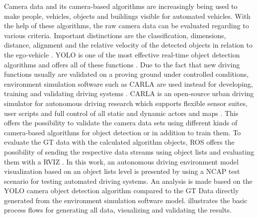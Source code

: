 Camera data and its camera-based algorithms are increasingly being used to make people, vehicles, objects and buildings visible for automated vehicles. With the help of these algorithms, the raw camera data can be evaluated regarding to various criteria. Important distinctions are the classification, dimensions, distance, alignment and the relative velocity of the detected objects in relation to the ego-vehicle \cite{Aeberhard}. \ac{YOLO} is one of the most effective real-time object detection algorithms and offers all of these functions \cite{knuthwebsite}.
Due to the fact that new driving functions usually are validated on a proving ground under controlled conditions, environment simulation software such as CARLA are used instead for developing, training and validating driving systems \cite{Gap}. CARLA is an open-source urban driving simulator for autonomous driving research which supports flexible sensor suites, user scripts and full control of all static and dynamic actors and maps \cite{Dosovitskiy17}. This offers the possibility to validate the camera data sets using different kinds of camera-based algorithms for object detection or in addition to train them. To evaluate the \ac{GT} data with the calculated algorithm objects, \ac{ROS} offers the possibility of sending the respective data streams using object lists and evaluating them with a \ac{RVIZ} \cite{ROS}.
In this work, an autonomous driving environment model visualization based on an object lists level is presented by using a NCAP test scenario for testing automated driving systems. An analysis is made based on the \ac{YOLO} camera object detection algorithm compared to the \ac{GT} Data directly generated from the environment simulation software model.  illustrates the basic process flows for generating all data, visualizing and validating the results.
